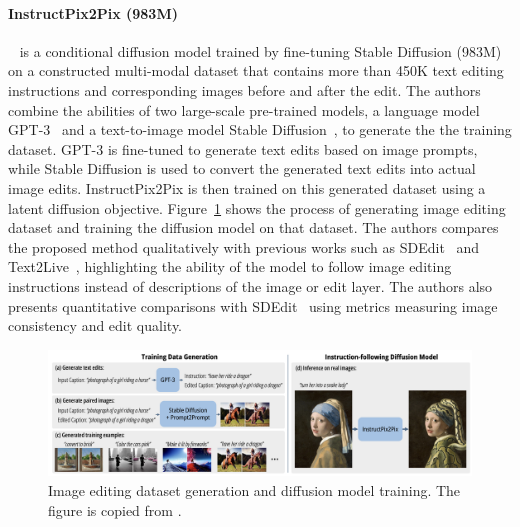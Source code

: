 \documentclass[11pt]{article}
\begin{document}
\paragraph{InstructPix2Pix (983M)}~\citep{Brooks2022InstructPix2PixLT} is a conditional diffusion model trained by fine-tuning Stable Diffusion (983M)~\citep{Rombach_2022_CVPR} on a constructed multi-modal dataset that contains more than 450K text editing instructions and corresponding images before and after the edit. The authors combine the abilities of two large-scale pre-trained models, a language model GPT-3~\citep{Brown2020LanguageMA} and a text-to-image model Stable Diffusion~\citep{Rombach_2022_CVPR}, to generate the the training dataset. GPT-3 is fine-tuned to generate text edits based on image prompts, while Stable Diffusion is used to convert the generated text edits into actual image edits. InstructPix2Pix is then trained on this generated dataset using a latent diffusion objective. Figure~\ref{fig:InstructPix2Pix} shows the process of generating image editing dataset and training the diffusion model on that dataset. The authors compares the proposed method qualitatively with previous works such as SDEdit~\citep{meng2022sdedit} and Text2Live~\citep{bar2022text2live}, highlighting the ability of the model to follow image editing instructions instead of descriptions of the image or edit layer. The authors also presents quantitative comparisons with SDEdit~\citep{meng2022sdedit} using metrics measuring image consistency and edit quality. 

\begin{figure}[t]
  \centering
  \begin{minipage}[t]{0.5\textwidth}
    \centering
    \includegraphics[width=1\textwidth]{figures/InstructPix2Pix.jpg}
  \end{minipage}%
  \caption{Image editing dataset generation and diffusion model training. The figure is copied from \citet{Brooks2022InstructPix2PixLT}.}
  \label{fig:InstructPix2Pix}
\end{figure}
\end{document}
